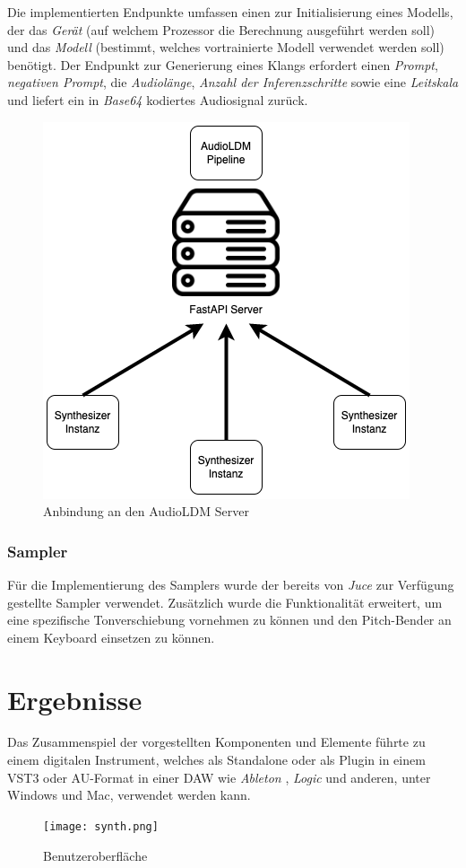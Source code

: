 \documentclass[
  a4paper,  %
  twoside,  %
  bibliography=totoc,
  headsepline,
  cleardoublepage=empty,
  parskip=half,
  draft=false
]{scrbook}
\begin{document}
Die implementierten Endpunkte umfassen einen zur Initialisierung eines Modells, der das \emph{Gerät} (auf welchem Prozessor die Berechnung ausgeführt werden soll) und das \emph{Modell} (bestimmt, welches vortrainierte Modell verwendet werden soll) benötigt. Der Endpunkt zur Generierung eines Klangs erfordert einen \emph{Prompt}, \emph{negativen Prompt}, die \emph{Audiolänge}, \emph{Anzahl der Inferenzschritte} sowie eine \emph{Leitskala} und liefert ein in \emph{Base64} kodiertes Audiosignal zurück.

\begin{figure}
  \centering
  \includegraphics[width=.4\textwidth]{graphics/Server.png}
  \caption[Infrastruktur]{Anbindung an den AudioLDM Server}
  \label{fig:server}
\end{figure}

\subsection{Sampler}

Für die Implementierung des Samplers wurde der bereits von \emph{Juce}\cite{noauthor_juce_nodate-1} zur Verfügung gestellte Sampler \cite{noauthor_juce_nodate} verwendet. Zusätzlich wurde die Funktionalität erweitert, um eine spezifische Tonverschiebung vornehmen zu können und den Pitch-Bender an einem Keyboard einsetzen zu können.

\chapter{Ergebnisse}
Das Zusammenspiel der vorgestellten Komponenten und Elemente führte zu einem digitalen Instrument, welches als Standalone oder als Plugin in einem VST3 oder AU-Format in einer DAW wie \emph{Ableton} \cite{noauthor_ableton_nodate}, \emph{Logic} \cite{noauthor_logic_nodate} und anderen, unter Windows und Mac, verwendet werden kann.

\begin{figure}[h]
  \centering
  \texttt{[image: synth.png]}
  \caption[Benutzeroberfläche]{Benutzeroberfläche}
  \label{fig:synth}
\end{figure} 
\end{document}
